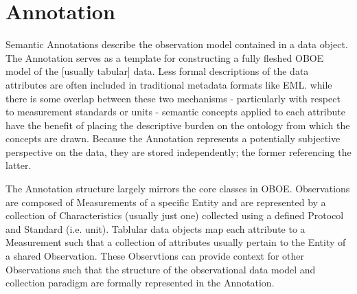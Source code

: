 
\section{Annotation}

Semantic Annotations describe the observation model contained in a data object. The Annotation serves as a template for constructing a fully fleshed OBOE model of the [usually tabular] data. Less formal descriptions of the data attributes are often included in traditional metadata formats like EML. while there is some overlap between these two mechanisms - particularly with respect to measurement standards or units - semantic concepts applied to each attribute have the benefit of placing the descriptive burden on the ontology from which the concepts are drawn. Because the Annotation represents a potentially subjective perspective on the data, they are stored independently; the former referencing the latter.

The Annotation structure largely mirrors the core classes in OBOE. Observations are composed of Measurements of a specific Entity and are represented by a collection of Characteristics (usually just one) collected using a defined Protocol and Standard (i.e. unit). 
Tablular data objects map each attribute to a Measurement such that a collection of attributes usually pertain to the Entity of a shared Observation. These Observtions can provide context for other Observations such that the structure of the observational data model and collection paradigm are formally represented in the Annotation.

